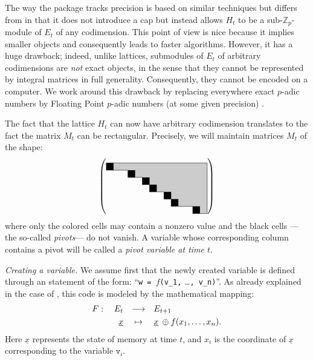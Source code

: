 \documentclass[sigconf]{acmart}
\newcommand{\Z}{\mathbb Z}
\newcommand{\Zp}{\Z_p}
\newcommand{\ttv}{\texttt{v}\xspace}
\newcommand{\ZpLC}{\text{\color{output} \rm \tt ZpLC}\xspace}
\newcommand{\ZpLF}{\text{\color{output} \rm \tt ZpLF}\xspace}
\theoremstyle{definition}
\begin{document}
The way the package \ZpLF tracks precision is based on similar 
techniques but differs from \ZpLC in that it does not introduce a cap 
but instead allows $H_t$ to be a sub-$\Zp$-module of $E_t$ of any 
codimension.
This point of view is nice because it implies smaller objects and 
consequently leads to faster algorithms. However, it has a huge 
drawback; indeed, unlike lattices, submodules of $E_t$ of arbitrary 
codimensions are \emph{not} exact objects, in the sense that they cannot 
be represented by integral matrices in full generality. Consequently,
they cannot be encoded on a computer.
We work around this drawback by replacing everywhere exact $p$-adic 
numbers by Floating Point $p$-adic numbers (at some given precision) 
\cite{course-padic}.

The fact that the lattice $H_t$ can now have arbitrary codimension
translates to the fact the matrix $M_t$ can be rectangular.
Precisely, we will maintain matrices $M_t$ of the shape:
\begin{equation}
\label{eq:shapeM-ZpLF}
\left(\raisebox{-0.5\height}{\begin{tikzpicture}[scale=0.3]
\fill[black!20] (0,0)--(0,-1)--(3,-1)--(3,-2)--(5,-2)--(5,-3)
    --(6,-3)--(6,-4)--(8,-4)--(8,-5)--(9,-5)--(9,-6)--(12,-6)
    --(12,-7)--(14,-7)--(14,0)--cycle;
\draw (0,0)--(0,-1)--(3,-1)--(3,-2)--(5,-2)--(5,-3)
    --(6,-3)--(6,-4)--(8,-4)--(8,-5)--(9,-5)--(9,-6)--(12,-6)
    --(12,-7)--(14,-7);
\fill (0,0) rectangle (1,-1);
\fill (3,-1) rectangle (4,-2);
\fill (5,-2) rectangle (6,-3);
\fill (6,-3) rectangle (7,-4);
\fill (8,-4) rectangle (9,-5);
\fill (9,-5) rectangle (10,-6);
\fill (12,-6) rectangle (13,-7);
\draw[thin] (14,-7)--(14,0)--(0,0);
\end{tikzpicture}}\right)
\end{equation}
where only the colored cells may contain a nonzero value and the 
black cells ---the so-called \emph{pivots}--- do not vanish. A
variable whose corresponding column contains a pivot will be called 
a \emph{pivot variable at time $t$}.


\medskip

\noindent \textit{Creating a variable.}
%
We assume first that the newly created variable is defined through an
statement of the form:
``\verb?w = ?$f$\verb?(v_1,? \ldots\verb?, v_n)?''.
As already explained in the case of \ZpLC, this code is 
modeled by the mathematical mapping:
$$\begin{array}{rcl}
F: \quad E_t & \longrightarrow & E_{t+1} \smallskip \\
\underline x & \mapsto & \underline x \:\oplus f(x_1, \ldots, x_n).
\end{array}$$
Here $\underline x$ represents the state of memory at time $t$, 
and $x_i$ is the coordinate of $\underline x$ corresponding to the
variable $\ttv_i$.
\end{document}
